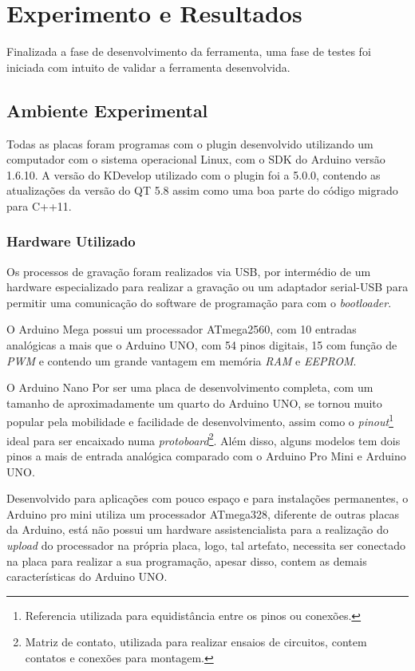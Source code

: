\chapter{Experimento e Resultados}
Finalizada a fase de desenvolvimento da ferramenta, uma fase de testes foi iniciada com intuito de validar a ferramenta desenvolvida.

\section{Ambiente Experimental}

Todas as placas foram programas com o plugin desenvolvido utilizando um computador com o sistema operacional Linux, com o SDK do Arduino versão 1.6.10. A versão do KDevelop utilizado com o plugin foi a 5.0.0, contendo as atualizações da versão do QT 5.8 assim como uma boa parte do código migrado para C++11.

\subsection{Hardware Utilizado}

Os processos de gravação foram realizados via USB, por intermédio de um hardware especializado para realizar a gravação ou um adaptador serial-USB para permitir uma comunicação do software de programação para com o \textit{bootloader}.

O Arduino Mega possui um processador ATmega2560, com 10 entradas analógicas a mais que o Arduino UNO, com 54 pinos digitais, 15 com função de \textit{PWM} e contendo um grande vantagem em memória \textit{RAM} e \textit{EEPROM}.



O Arduino Nano Por ser uma placa de desenvolvimento completa, com um tamanho de aproximadamente um quarto do Arduino UNO, se tornou muito popular pela mobilidade e facilidade de desenvolvimento, assim como o \textit{pinout}\footnote{ Referencia utilizada para equidistância entre os pinos ou conexões.} ideal para ser encaixado numa \textit{protoboard}\footnote{Matriz de contato, utilizada para realizar ensaios de circuitos, contem contatos e conexões para montagem.}. Além disso, alguns modelos tem dois pinos a mais de entrada analógica comparado com o Arduino Pro Mini e Arduino UNO.

Desenvolvido para aplicações com pouco espaço e para instalações permanentes, o Arduino pro mini utiliza um processador ATmega328,  diferente de outras placas da Arduino, está não possui um hardware assistencialista para a realização do \textit{upload} do processador na própria placa, logo, tal artefato, necessita ser conectado na placa para realizar a sua programação, apesar disso, contem as demais características do Arduino UNO.

